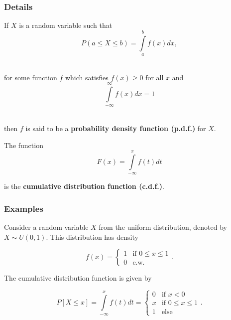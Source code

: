 \documentclass[12pt,a4paper]{article}
\theoremstyle{regla}
\theoremstyle{remark}
\theoremstyle{definition}
\theoremstyle{nonumberbreak}
\begin{document}
\subsubsection{Details}
\begin{defn}
If $X$ is a random variable such that \\
$$P(a\leq X\leq b)=\int\limits^{b}_{a}f(x)dx,$$

\\
for some function $f$ which satisfies $f(x)\geq0$ for all $x$ and\\
$$\int\limits^\infty_{-\infty} f(x)dx = 1$$

\\
then $f$ is said to be a {\bf probability density function (p.d.f.)} for $X$.
\end{defn}
\begin{defn}
The function
$$ F(x)= \int\limits^{x}_{-\infty} f(t)dt$$

is the {\bf cumulative distribution function (c.d.f.)}. 
\end{defn}
\subsubsection{Examples}
\begin{xmpl}
Consider a random variable $X$ from the uniform distribution, denoted by $X\sim U(0,1)$.  This distribution has density

$$
f(x) = 
\begin{cases}
  1 &\text{if } 0 \leq x \leq 1\\
  0 &\text{e.w.}
\end{cases}.
$$

The cumulative distribution function is given by

$$
P[X\leq x] = \int\limits^{x}_{-\infty} f(t)dt = 
\begin{cases}
  0 & \text{if } x<0\\
  x & \text{if } 0 \leq x \leq 1\\
  1 & \text{else}
\end{cases}.
$$

\end{xmpl}
\end{document}

